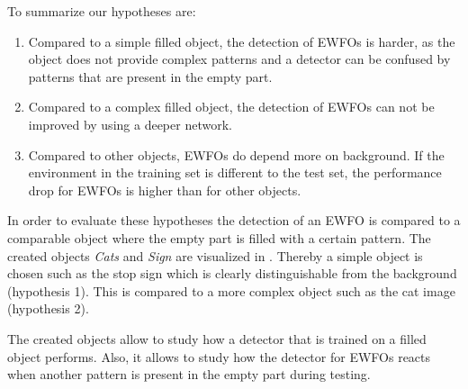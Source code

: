 To summarize our hypotheses are:
\begin{enumerate}
	\item Compared to a simple filled object, the detection of \acp{EWFO} is harder, as the object does not provide complex patterns and a detector can be confused by patterns that are present in the empty part. 
	\item Compared to a complex filled object, the detection of \acp{EWFO} can not be improved by using a deeper network.
	\item Compared to other objects, \acp{EWFO} do depend more on background. If the environment in the training set is different to the test set, the performance drop for \acp{EWFO} is higher than for other objects. 
\end{enumerate}

In order to evaluate these hypotheses the detection of an \ac{EWFO} is compared to a comparable object where the empty part is filled with a certain pattern. The created objects \textit{Cats} and \textit{Sign} are visualized in . Thereby a simple object is chosen such as the stop sign which is clearly distinguishable from the background (hypothesis 1). This is compared to a more complex object such as the cat image (hypothesis 2).

The created objects allow to study how a detector that is trained on a filled object performs. Also, it allows to study how the detector for \acp{EWFO} reacts when another pattern is present in the empty part during testing.

